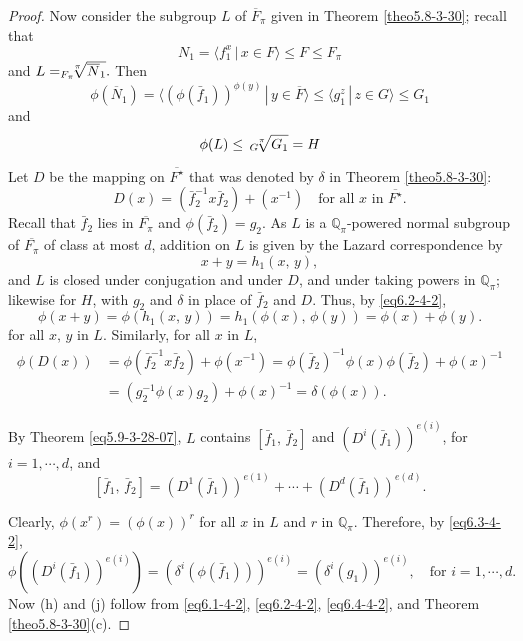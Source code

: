 \documentclass[mathscr]{amsart}
\theoremstyle{theorem}
\theoremstyle{definition}
\numberwithin{equation}{section}
\def \({\left(}
\def \){\right)}
\def\[{\left[}
\def\]{\right]}
\def\Q{\mathbb{Q}}
\def\ol{\overline}
\begin{document}
\begin{proof}
Now consider the subgroup $L$ of $\ol{F}_\pi$ given in Theorem
\ref{theo5.8-3-30}; recall that
$$N_1=\langle f_1^x\,|\,x\in F\rangle\leq F\leq F_\pi$$
and $L=_{F_\pi}\hspace*{-0.2cm}\sqrt[\pi]{\ol{N}_1}.$ Then
$$\phi(\ol{N}_1)=\langle\(\phi\(\bar f_1\)\)^{\phi(y)}\,|\,y\in\ol{F}\rangle\leq \langle g_1^z\,|\,z\in G\rangle\leq G_1$$
and
\begin{equation}\label{eq6.2-4-2}
\phi(L)\leq\, _{G}\hspace*{-0.1cm}\sqrt[\pi]{G_1}=H
\end{equation}

Let $D$ be the mapping on $\ol{F^\star}$ that was denoted by
$\delta$ in Theorem \ref{theo5.8-3-30}:
$$D(x)=\(\bar f_2^{-1}x\bar f_2\)+\(x^{-1}\)\quad\text{for all $x$ in $\ol{F^\star}.$}$$
Recall that $\bar f_2$ lies in $\ol{F_\pi}$ and $\phi\(\bar
f_2\)=g_2$. As $L$ is a $\Q_\pi$-powered normal subgroup of
$\ol{F_\pi}$ of class at most $d$, addition on $L$ is given by the
Lazard correspondence by
$$x+y=h_1(x,\,y),$$
and $L$ is closed under conjugation and under $D$, and under taking
powers in $\Q_\pi$; likewise for $H$, with $g_2$ and $\delta$ in
place of $\bar f_2$ and $D$. Thus, by \eqref{eq6.2-4-2},
$$\phi(x+y)=\phi\(h_1(x,\,y)\)=h_1\(\phi(x),\,\phi(y)\)=\phi(x)+\phi(y).$$
for all $x,\,y$ in $L$. Similarly, for all $x$ in $L$,
\begin{equation}\label{eq6.3-4-2}
\begin{aligned}
\phi\(D(x)\) &= \phi(\bar f_2^{-1}x\bar f_2)+\phi\(x^{-1}\)=
\phi\(\bar f_2\)^{-1}\phi(x)\phi(\bar f_2)+\phi\(x\)^{-1}\\
&=\(g_2^{-1}\phi(x)g_2\)+\phi(x)^{-1}=\delta\(\phi(x)\).
\end{aligned}
\end{equation}

By Theorem \ref{eq5.9-3-28-07}, $L$ contains $\[\bar f_1,\,\bar
f_2\]$ and $\(D^i\(\bar f_1\)\)^{e(i)}$, for $i=1,\cdots, d$, and
\begin{equation}\label{eq6.4-4-2}
\[\bar f_1,\,\bar f_2\]=\(D^1\(\bar f_1\)\)^{e(1)}+\cdots+\(D^d\(\bar
f_1\)\)^{e(d)}.
\end{equation}

Clearly, $\phi\(x^r\)=\(\phi(x)\)^r$ for all $x$ in $L$ and $r$ in
$\Q_\pi$. Therefore, by \eqref{eq6.3-4-2},
$$\phi\(\(D^i\(\bar f_1\)\)^{e(i)}\)=\(\delta^i\(\phi\(\bar f_1\)\)\)^{e(i)}=\(\delta^i\(g_1\)\)^{e(i)},\quad\text{for }i=1,\cdots,d.$$
Now (h) and (j) follow from \eqref{eq6.1-4-2}, \eqref{eq6.2-4-2},
\eqref{eq6.4-4-2}, and Theorem \ref{theo5.8-3-30}(c).


\end{proof}
\end{document}
